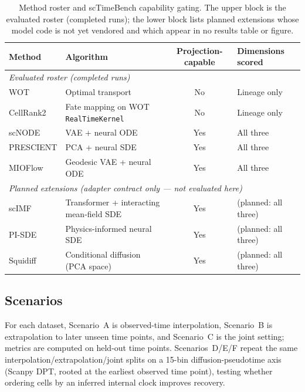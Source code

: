 \documentclass[11pt]{article}
\newcommand{\code}[1]{\texttt{\small #1}}
\begin{document}
\begin{table}[ht]
\centering
\caption{Method roster and scTimeBench capability gating. The upper block is the
evaluated roster (completed runs); the lower block lists planned extensions whose model
code is not yet vendored and which appear in no results table or figure.}
\label{tab:methods}
\small
\begin{tabular}{l l c l}
\toprule
Method & Algorithm & Projection-capable & Dimensions scored \\
\midrule
\multicolumn{4}{l}{\emph{Evaluated roster (completed runs)}}\\
WOT        & Optimal transport                        & No  & Lineage only \\
CellRank2  & Fate mapping on WOT \code{RealTimeKernel} & No  & Lineage only \\
scNODE     & VAE + neural ODE                         & Yes & All three \\
PRESCIENT  & PCA + neural SDE                         & Yes & All three \\
MIOFlow    & Geodesic VAE + neural ODE                & Yes & All three \\
\midrule
\multicolumn{4}{l}{\emph{Planned extensions (adapter contract only --- not evaluated here)}}\\
scIMF      & Transformer + interacting mean-field SDE & Yes & (planned: all three) \\
PI-SDE     & Physics-informed neural SDE              & Yes & (planned: all three) \\
Squidiff   & Conditional diffusion (PCA space)        & Yes & (planned: all three) \\
\bottomrule
\end{tabular}
\end{table}

\subsection{Scenarios}
For each dataset, Scenario~A is observed-time interpolation, Scenario~B is
extrapolation to later unseen time points, and Scenario~C is the joint setting;
metrics are computed on held-out time points. Scenarios~D/E/F repeat the same
interpolation/extrapolation/joint splits on a 15-bin diffusion-pseudotime axis
(Scanpy DPT, rooted at the earliest observed time point), testing whether
ordering cells by an inferred internal clock improves recovery.
\end{document}

